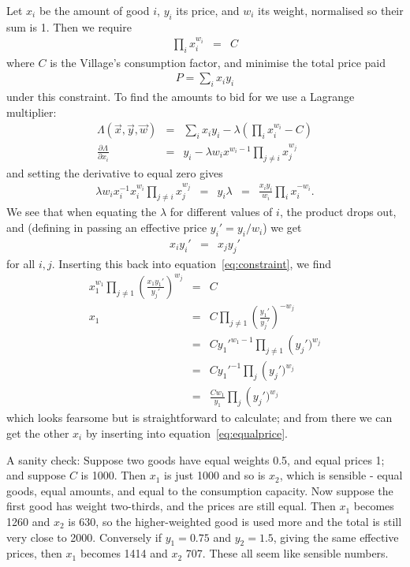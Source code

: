 Let $x_i$ be the amount of good $i$, $y_i$ its price, and $w_i$ its
weight, normalised so their sum is 1. Then we require
\begin{eqnarray}
\label{eq:constraint}
\prod\limits_i x_i^{w_i} &=& C
\end{eqnarray}
where $C$ is the Village's consumption factor, and minimise the total
price paid
\begin{eqnarray*}
P = \sum\limits_i x_iy_i
\end{eqnarray*}
under this constraint. To find the amounts to bid for we use a
Lagrange multiplier:
\begin{eqnarray*}
\Lambda(\vec x, \vec y, \vec w) &=& \sum\limits_i x_iy_i -
\lambda\left(\prod\limits_i x_i^{w_i} - C\right)\\
\frac{\partial\Lambda}{\partial x_i} &=& y_i - \lambda w_ix^{w_i-1}\prod\limits_{j\ne i} x_j^{w_j}
\end{eqnarray*}
and setting the derivative to equal zero gives
\begin{eqnarray*}
\lambda w_ix_i^{-1}x_i^{w_i}\prod\limits_{j\ne i} x_j^{w_j} &=& y_i
\lambda &=& \frac{x_iy_i}{w_i}\prod\limits_i x_i^{-w_i}.
\end{eqnarray*}
We see that when equating the $\lambda$ for different values of $i$,
the product drops out, and (defining in passing an effective price
$y_i'=y_i/w_i$) we get
\begin{eqnarray}
\label{eq:equalprice}
x_iy_i' &=& x_jy_j'
\end{eqnarray}
for all $i, j$. Inserting this back into equation~\ref{eq:constraint},
we find
\begin{eqnarray}
x_1^{w_1}\prod\limits_{j\ne 1} \left(\frac{x_1y_1'}{y_j'}\right)^{w_j} &=& C\\
x_1 &=& C \prod\limits_{j\ne 1}\left(\frac{y_1'}{y_j'}\right)^{-w_j} \\
\label{eq:amount}
    &=& Cy_1'^{w_1-1} \prod\limits_{j\ne 1}\left(y_j')^{w_j}\\
    &=& Cy_1'^{-1} \prod\limits_{j}\left(y_j')^{w_j}\\
    &=& \frac{Cw_1}{y_1} \prod\limits_{j}\left(y_j')^{w_j}
\end{eqnarray}
which looks fearsome but is straightforward to calculate; and from
there we can get the other $x_i$ by inserting into
equation~\ref{eq:equalprice}.

A sanity check: Suppose two goods have equal weights 0.5, and equal
prices 1; and suppose $C$ is 1000. Then $x_1$ is just 1000 and so is
$x_2$, which is sensible - equal goods, equal amounts, and equal to
the consumption capacity. Now suppose the first good has weight
two-thirds, and the prices are still equal. Then $x_1$ becomes 1260
and $x_2$ is 630, so the higher-weighted good is used more and the
total is still very close to 2000. Conversely if $y_1=0.75$ and
$y_2=1.5$, giving the same effective prices, then $x_1$ becomes 1414
and $x_2$ 707. These all seem like sensible numbers.

